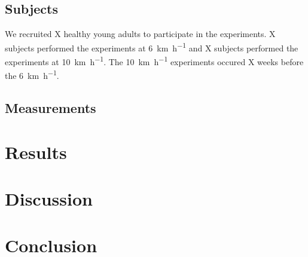 \documentclass{article}
\begin{document}
\subsection{Subjects}
%
We recruited X healthy young adults to participate in the experiments. X
subjects performed the experiments at 6~\si{\kilo\meter\per\hour} and X
subjects performed the experiments at 10~\si{\kilo\meter\per\hour}. The
10~\si{\kilo\meter\per\hour} experiments occured X weeks before the
6~\si{\kilo\meter\per\hour}.

\subsection{Measurements}

\section{Results}

\section{Discussion}

\section{Conclusion}
\end{document}
